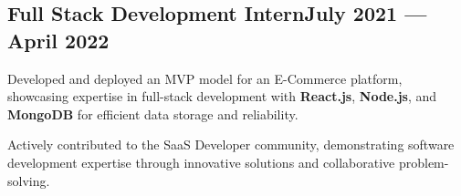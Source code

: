 \subsection{{Full Stack Development Intern\hfill July 2021 --- April 2022}}
\begin{zitemize}
\item Developed and deployed an MVP model for an E-Commerce platform, showcasing expertise in full-stack development with \textbf{React.js}, \textbf{Node.js}, and \textbf{MongoDB} for efficient data storage and reliability.
\item Actively contributed to the SaaS Developer community, demonstrating software development expertise through innovative solutions and collaborative problem-solving.
\end{zitemize}

